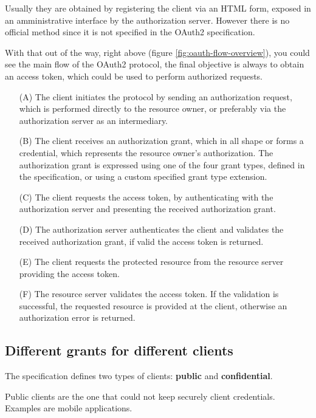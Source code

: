 Usually they are obtained by registering the client via an HTML form, exposed
in an amministrative interface by the authorization server.
However there is no official method since it is not specified in the OAuth2
specification.

With that out of the way, right above (figure \ref{fig:oauth-flow-overview}),
you could see the main flow of the OAuth2 protocol, the final objective is
always to obtain an access token, which could be used to perform authorized
requests.


 \begin{itemize}
     \item[(A)]
         The client initiates the protocol by sending an authorization request,
         which is performed directly to the resource owner, or preferably via
         the authorization server as an intermediary.
     \item[(B)]
         The client receives an authorization grant, which in all shape or
         forms a credential, which represents the resource owner's
         authorization.  The authorization grant is expressed using one of the
         four grant types, defined in the specification, or using a custom
         specified grant type extension.
     \item[(C)]
         The client requests the access token, by authenticating with the
         authorization server and presenting the received authorization grant.
     \item[(D)]
         The authorization server authenticates the client and validates the
         received authorization grant, if valid the access token is returned.
     \item[(E)]
         The client requests the protected resource from the resource
         server providing the access token.
     \item[(F)]
         The resource server validates the access token.
         If the validation is successful, the requested resource is provided at the client,
         otherwise an authorization error is returned.
 \end{itemize}

\subsection{Different grants for different clients}
The specification defines two types of clients: \textbf{public} and \textbf{confidential}.

Public clients are the one that could not keep securely client credentials.
Examples are mobile applications.

